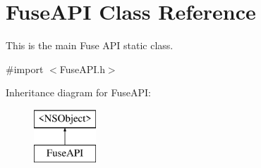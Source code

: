 \hypertarget{interface_fuse_a_p_i}{}\section{Fuse\+A\+P\+I Class Reference}
\label{interface_fuse_a_p_i}


This is the main Fuse A\+P\+I static class.  




{\ttfamily \#import $<$Fuse\+A\+P\+I.\+h$>$}

Inheritance diagram for Fuse\+A\+P\+I\+:\begin{figure}[H]
\begin{center}
\leavevmode
\includegraphics[height=2.000000cm]{interface_fuse_a_p_i}
\end{center}
\end{figure}
